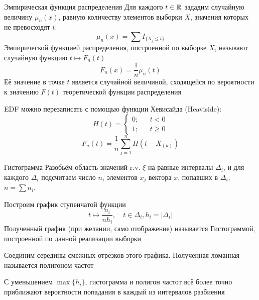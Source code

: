 \begin{dfn}{Эмпирическая функция распределения}
Для каждого $t\in\mathbb R$ зададим случайную величину $\mu_n(x)$,
равную количеству элементов выборки $X$,
значения которых не превосходят $t$:
$$\mu_n(x) = \sum I_{ \{ X_j \leq t \} }$$
Эмпирической функцией распределения, построенной по выборке $X$,
называют случайную функцию $t\mapsto F_n(t)$
$$F_n(x) = \frac{1}{n} \mu_n(t)$$
Её значение в точке $t$ является случайной величиной,
сходящейся по вероятности к значению $F(t)$
теоретической функции распределения

\begin{mbox}
EDF можно перезаписать с помощью функции Хевисайда (Heaviside):
\nopagebreak
$$H(t) =
\left\{\begin{aligned}
0; && t < 0 \\
1; && t \geq 0
\end{aligned}\right.$$
$$F_n(t) = \frac{1}{n} \sum_{j=1}^n H(t - X_{(k)})$$
\end{mbox}
\end{dfn}

\begin{dfn}{Гистограмма}
Разобьём область значений r.v. $\xi$ на равные интервалы $\Delta_i$,
и для каждого $\Delta_i$ подсчитаем число $n_i$ элементов $x_j$ вектора $x$,
попавших в $\Delta_i$, $n = \sum n_i$.

Построим график ступенчатой функции $$t\mapsto \frac{n_i}{n h_i},\quad t\in\Delta_i, h_i=|\Delta_i|$$
Полученный график (при желании, само отображение) называется Гистограммой,
построенной по данной реализации выборки

Соединим середины смежных отрезков этого графика.
Полученная ломанная называется полигоном частот

С уменьшением $\max\{h_i\}$,
гистограмма и полигон частот всё более точно приближают
вероятности попадания в каждый из интервалов разбиения
\end{dfn}
